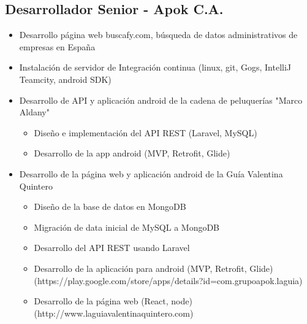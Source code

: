 \documentclass[letterpaper,11pt]{report}
\begin{document}
\subsection*{Desarrollador Senior - Apok C.A.}
  \begin{itemize}
    \item Desarrollo página web buscafy.com, búsqueda de datos administrativos de empresas en España
    \item Instalación de servidor de Integración continua (linux, git, Gogs, IntelliJ Teamcity, android SDK)
    \item Desarrollo de API y aplicación android de la cadena de peluquerías "Marco Aldany"
      \begin{itemize}
        \item Diseño e implementación del API REST (Laravel, MySQL)
        \item Desarrollo de la app android (MVP, Retrofit, Glide)
      \end{itemize}
    \item Desarrollo de la página web y aplicación android de la Guía Valentina Quintero
      \begin{itemize}
        \item Diseño de la base de datos en MongoDB
        \item Migración de data inicial de MySQL a MongoDB
        \item Desarrollo del API REST usando Laravel
        \item Desarrollo de la aplicación para android (MVP, Retrofit, Glide) (https://play.google.com/store/apps/details?id=com.grupoapok.laguia)
        \item Desarrollo de la página web (React, node) (http://www.laguiavalentinaquintero.com)
      \end{itemize}
  \end{itemize}
\end{document}
